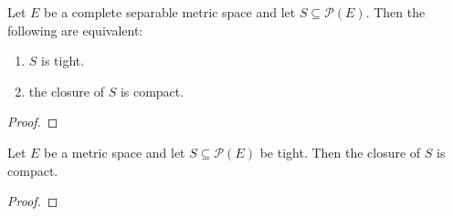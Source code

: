 






\begin{theorem}\label{thm:prokhorov}
\notready
{}
Let $E$ be a complete separable metric space and let $S \subseteq \mathcal P(E)$. Then the following are equivalent:
\begin{enumerate}
	\item $S$ is tight.
	\item the closure of $S$ is compact.
\end{enumerate}
\end{theorem}

\begin{proof}
\end{proof}


\begin{lemma}\label{lem:relatively_compact_of_tight}
\leanok
{}
Let $E$ be a metric space and let $S \subseteq \mathcal P(E)$ be tight. Then the closure of $S$ is compact.
\end{lemma}

\begin{proof}
\end{proof}
